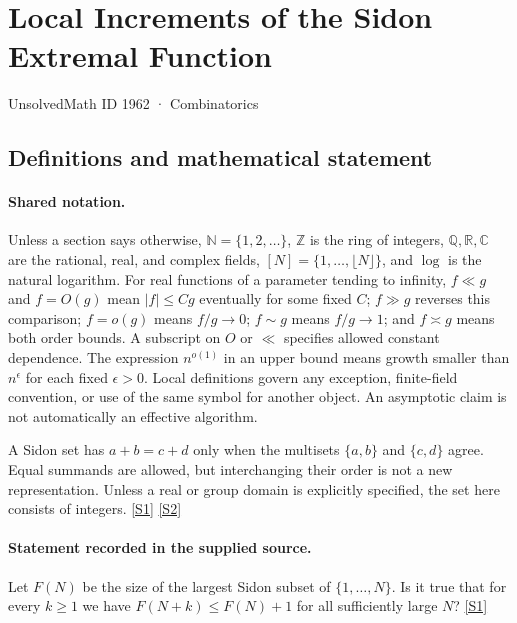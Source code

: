 \documentclass[11pt,a4paper]{article}
\newcommand{\N}{\mathbb{N}}
\newcommand{\Z}{\mathbb{Z}}
\newcommand{\Q}{\mathbb{Q}}
\newcommand{\R}{\mathbb{R}}
\newcommand{\C}{\mathbb{C}}
\newcommand{\sref}[2]{\hyperlink{source:#1:#2}{[S#2]}}
\begin{document}

\setcounter{section}{1961}

\section{Local Increments of the Sidon Extremal Function}\label{1962}

{\small\sffamily UnsolvedMath ID 1962 · Combinatorics}

\subsection{Definitions and mathematical statement}

\paragraph{Shared notation.}Unless a section says otherwise, $\N=\{1,2,\ldots\}$,
$\Z$ is the ring of integers, $\Q,\R,\C$ are the rational, real, and complex
fields, $[N]=\{1,\ldots,\lfloor N\rfloor\}$, and $\log$ is the natural
logarithm. For real functions of a parameter tending to infinity,
$f\ll g$ and $f=O(g)$ mean $|f|\leq Cg$ eventually for some fixed $C$;
$f\gg g$ reverses this comparison; $f=o(g)$ means $f/g\to0$;
$f\sim g$ means $f/g\to1$; and $f\asymp g$ means both order bounds.
A subscript on $O$ or $\ll$ specifies allowed constant dependence.
The expression $n^{o(1)}$ in an upper bound means growth smaller than
$n^\epsilon$ for each fixed $\epsilon>0$. Local definitions govern any
exception, finite-field convention, or use of the same symbol for another
object. An asymptotic claim is not automatically an effective algorithm.



A Sidon set has $a+b=c+d$ only when the multisets $\{a,b\}$ and $\{c,d\}$ agree. Equal summands are allowed, but interchanging their order is not a new representation. Unless a real or group domain is explicitly specified, the set here consists of integers. \sref{1962}{1} \sref{1962}{2}

\paragraph{Statement recorded in the supplied source.}
Let $F(N)$ be the size of the largest Sidon subset of $\{1,\ldots,N\}$. Is it true that for every $k\geq 1$ we have $ F(N+k)\leq F(N)+1 $ for all sufficiently large $N$? \sref{1962}{1}
\end{document}
